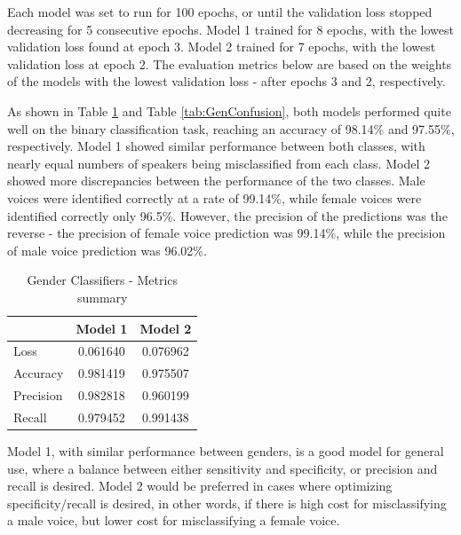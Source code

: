 Each model was set to run for 100 epochs, or until the validation loss stopped decreasing for 5 consecutive epochs. Model 1 trained for 8 epochs, with the lowest validation loss found at epoch 3. Model 2 trained for 7 epochs, with the lowest validation loss at epoch 2. The evaluation metrics below are based on the weights of the models with the lowest validation loss - after epochs 3 and 2, respectively.

As shown in Table \ref{tab:GenMetricsSum} and Table \ref{tab:GenConfusion}, both models performed quite well on the binary classification task, reaching an accuracy of 98.14\% and 97.55\%, respectively. Model 1 showed similar performance between both classes, with nearly equal numbers of speakers being misclassified from each class. Model 2 showed more discrepancies between the performance of the two classes. Male voices were identified correctly at a rate of 99.14\%, while female voices were identified correctly only 96.5\%. However, the precision of the predictions was the reverse - the precision of female voice prediction was 99.14\%, while the precision of male voice prediction was 96.02\%.

\begin{table}[h]
\begin{center}
\caption{Gender Classifiers - Metrics summary}
\begin{tabular}{l c c}
& 	Model 1 & Model 2 \\ \hline
Loss	&0.061640 & 0.076962 \\
Accuracy& 0.981419 & 0.975507 \\
Precision & 0.982818 & 0.960199 \\
Recall & 0.979452 & 0.991438 \\
\end{tabular}
\label{tab:GenMetricsSum}
\end{center}
\end{table}

Model 1, with similar performance between genders, is a good model for general use, where a balance between either sensitivity and specificity, or precision and recall is desired. Model 2 would be preferred in cases where optimizing specificity/recall is desired, in other words, if there is high cost for misclassifying a male voice, but lower cost for misclassifying a female voice.

